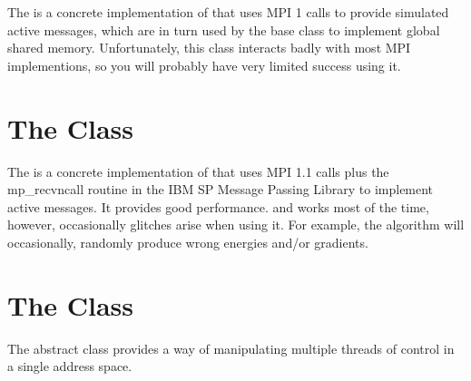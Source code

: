 The  is a concrete implementation of
 that uses MPI 1 calls to provide simulated active
messages, which are in turn used by the  base
class to implement global shared memory.  Unfortunately, this class
interacts badly with most MPI implementions, so you will probably have
very limited success using it.


\section{The  Class}
\label{MPLMemoryGrp}

The  is a concrete implementation of
 that uses MPI 1.1 calls plus the mp\_recvncall
routine in the IBM SP Message Passing Library to implement active messages.
It provides good performance.  and works most of the time, however,
occasionally glitches arise when using it.  For example, the
  algorithm will occasionally, randomly
produce wrong energies and/or gradients.


\section{The  Class}
\label{ThreadGrp}

The  abstract class provides a way of manipulating
multiple threads of control in a single address space.

